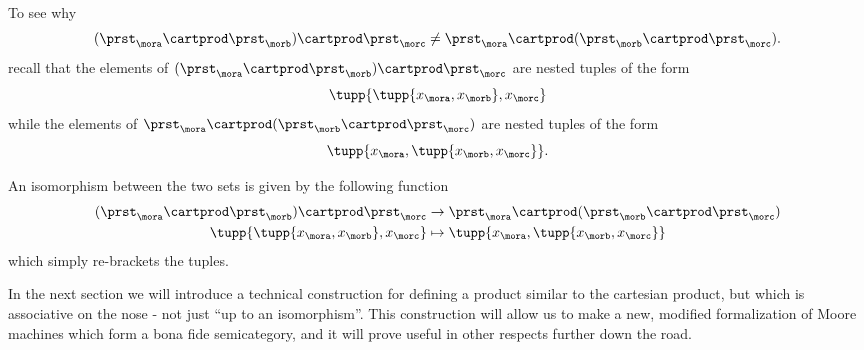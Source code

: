 To see why
\begin{equation}
    \label{eq:assoc-fails1}
    (\prst_{\mora} \cartprod \prst_{\morb}) \cartprod \prst_{\morc} \neq \prst_{\mora} \cartprod (\prst_{\morb} \cartprod \prst_{\morc}).
\end{equation}
recall that the elements of $(\prst_{\mora} \cartprod \prst_{\morb}) \cartprod \prst_{\morc}$ are nested tuples of the form
$$\tupp{ \tupp{x_{\mora}, x_{\morb}}, x_{\morc} }$$ while the elements of $\prst_{\mora} \cartprod (\prst_{\morb} \cartprod \prst_{\morc})$ are nested tuples of the form $$\tupp{x_{\mora}, \tupp{x_{\morb}, x_{\morc}} }.$$

An isomorphism between the two sets is given by the following function
\begin{equation}
    \label{eq:assoc-fails2}
    \begin{aligned}
        (\prst_{\mora} \cartprod \prst_{\morb}) \cartprod \prst_{\morc} & \to \prst_{\mora} \cartprod (\prst_{\morb} \cartprod \prst_{\morc}) \\
        \tupp{ \tupp{x_{\mora}, x_{\morb}}, x_{\morc} }                 & \mapsto \tupp{x_{\mora}, \tupp{x_{\morb}, x_{\morc}} }
    \end{aligned}
\end{equation}
which simply re-brackets the tuples.

In the next section we will introduce a technical construction for defining a product similar to the cartesian product, but which is associative on the nose - not just ``up to an isomorphism''. This construction will allow us to make a new, modified formalization of Moore machines which form a bona fide semicategory, and it will prove useful in other respects further down the road.
